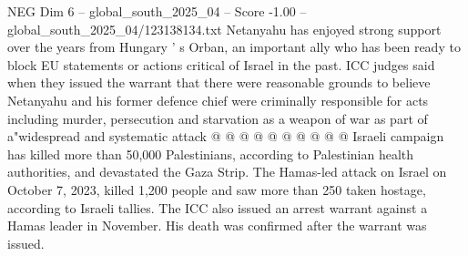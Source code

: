 \begin{textsample}{NEG Dim 6 – global\_south\_2025\_04 – Score -1.00 – global\_south\_2025\_04/123138134.txt}
Netanyahu has enjoyed strong support over the years from Hungary ' s Orban, an important ally who has been ready to block EU statements or actions critical of Israel in the past.
ICC judges said when they issued the warrant that there were reasonable grounds to believe Netanyahu and his former defence chief were criminally responsible for acts including murder, persecution and starvation as a weapon of war as part of a"widespread and systematic attack @ @ @ @ @ @ @ @ @ @ Israeli campaign has killed more than 50,000 Palestinians, according to Palestinian health authorities, and devastated the Gaza Strip.
The Hamas-led attack on Israel on October 7, 2023, killed 1,200 people and saw more than 250 taken hostage, according to Israeli tallies.
The ICC also issued an arrest warrant against a Hamas leader in November.
His death was confirmed after the warrant was issued.

\end{textsample}
